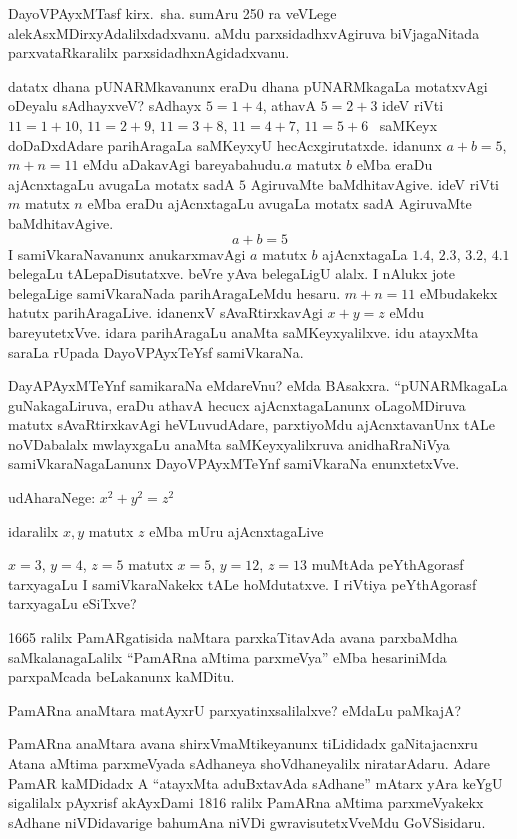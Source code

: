 DayoVPAyxMTasf kirx.~sha. sumAru {\rm 250} ra veVLege alekAsxMDirxyAdalilxdadxvanu. aMdu parxsidadhxvAgiruva biVjagaNitada parxvataRkaralilx parxsidadhxnAgidadxvanu.

datatx dhana pUNARMkavanunx eraDu dhana pUNARMkagaLa motatxvAgi oDeyalu sAdhayxveV? sAdhayx $5=1+4$, athavA $5=2+3$ ideV riVti $11=1+10$, $11=2+9$,  $11=3+8$, $11=4+7$, $11=5+6$~ saMKeyx doDaDxdAdare parihAragaLa saMKeyxyU hecAcxgirutatxde. idanunx $a+b=5$, $m+n=11$ eMdu aDakavAgi bareyabahudu.\break $a$\; matutx \;$b$\; eMba eraDu ajAcnxtagaLu avugaLa motatx sadA $5$ AgiruvaMte baMdhitavAgive. ideV riVti \;$m$\; matutx \;$n$\; eMba eraDu ajAcnxtagaLu avugaLa motatx sadA AgiruvaMte baMdhitavAgive.
$$
a+b=5
$$
I samiVkaraNavanunx anukarxmavAgi $a$ matutx $b$ ajAcnxtagaLa $1.4$, $2.3$, $3.2$, $4.1$ belegaLu tALepaDisutatxve. beVre yAva belegaLigU alalx. I nAlukx jote belegaLige samiVkaraNada parihAragaLeMdu hesaru. $m+n=11$ eMbudakekx hatutx parihAragaLive. idanenxV sAvaRtirxkavAgi  $x+y=z$ eMdu bareyutetxVve. idara parihAragaLu anaMta saMKeyxyalilxve. idu atayxMta saraLa rUpada DayoVPAyxTeYsf samiVkaraNa.

DayAPAyxMTeYnf samikaraNa eMdareVnu? eMda BAsakxra. ``pUNARMkagaLa guNaka\-gaLiruva, eraDu athavA hecucx ajAcnxtagaLanunx oLagoMDiruva matutx sAvaRtirxkavAgi heVLuvudAdare, parxtiyoMdu ajAcnxtavanUnx tALe noVDabalalx mwlayxgaLu anaMta saMKeyxyalilxruva anidhaRraNiVya samiVkaraNagaLanunx DayoVPAyxMTeYnf samiVkaraNa enunxtetxVve.

udAharaNege: \quad $x^2+y^2=z^2$

idaralilx $x,y$ matutx $z$ eMba mUru ajAcnxtagaLive 

$x=3$, $y=4$, $z=5$ matutx $x=5$, $y=12$, $z=13$ muMtAda peYthAgorasf tarxyagaLu I samiVkaraNakekx tALe hoMdutatxve. I riVtiya peYthAgorasf tarxyagaLu eSiTxve? 

{\rm 1665} ralilx PamARgatisida naMtara parxkaTitavAda avana parxbaMdha saMkalanagaLalilx ``PamARna aMtima parxmeVya'' eMba hesariniMda parxpaMcada beLakanunx kaMDitu.

PamARna anaMtara matAyxrU parxyatinxsalilalxve? eMdaLu paMkajA?

PamARna anaMtara avana shirxVmaMtikeyanunx tiLididadx gaNitajacnxru Atana aMtima parxmeVyada sAdhaneya shoVdhaneyalilx niratarAdaru. Adare PamAR kaMDidadx A ``atayxMta aduBxtavAda sAdhane'' mAtarx yAra keYgU sigalilalx pAyxrisf akAyxDami {\rm 1816} ralilx PamARna aMtima parxmeVyakekx sAdhane niVDidavarige bahumAna niVDi gwravisutetxVveMdu  GoVSisidaru.

